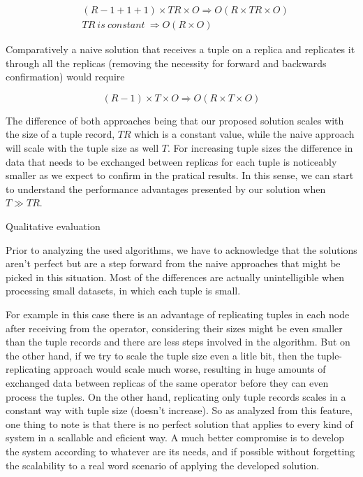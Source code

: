 \documentclass[times, 10pt,twocolumn]{article}
\begin{document}
\begin{eqnarray*} &(R - 1 + 1 + 1) \times TR \times O \Rightarrow O(R
	\times TR \times O) \\ &TR\ is\ constant\ \Rightarrow O(R \times O)
\end{eqnarray*}

Comparatively a naive solution that receives a tuple on a replica and
replicates it through all the replicas (removing the necessity for forward
and backwards confirmation) would require 

\[ (R-1)\times T \times O \Rightarrow O(R \times T \times O)\]

The difference of both approaches being that our proposed solution scales
with the size of a tuple record, $TR$ which is a constant value, while the
naive approach will scale with the tuple size as well $T$. For increasing
tuple sizes the difference in data that needs to be exchanged between
replicas for each tuple is noticeably smaller as we expect to confirm in
the pratical results. In this sense, we can start to understand the
performance advantages presented by our solution when $T \gg TR$.




Qualitative evaluation


Prior to analyzing the used algorithms, we have to acknowledge that the
solutions aren't perfect but are a step forward from the naive approaches
that might be picked in this situation. Most of the differences are
actually unintelligible when processing small datasets, in which each
tuple is small. 

For example in this case there is an advantage of replicating tuples in
each node after receiving from the operator, considering their sizes might
be even smaller than the tuple records and there are less steps involved
in the algorithm. But on the other hand, if we try to scale the tuple size
even a litle bit, then the tuple-replicating approach would scale much
worse, resulting in huge amounts of exchanged data between replicas of the
same operator before they can even process the tuples. On the other hand,
replicating only tuple records scales in a constant way with tuple size
(doesn't increase).  So as analyzed from this feature, one thing to note
is that there is no perfect solution that applies to every kind of system
in a scallable and eficient way.  A much better compromise is to develop
the system according to whatever are its needs, and if possible without
forgetting the scalability to a real word scenario of applying the
developed solution.
\end{document}

